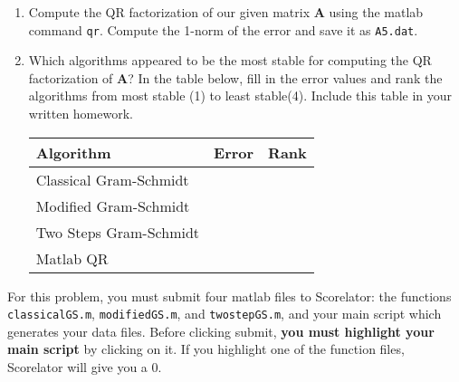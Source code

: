 \documentclass{article}
\begin{document}
\begin{enumerate}
\begin{enumerate}
	\item Compute the QR factorization of our given matrix $\mathbf{A}$ using the matlab command {\tt qr}. Compute the 1-norm of the error and save it as {\tt A5.dat}. 
	\item Which algorithms appeared to be the most stable for computing the QR factorization of $\mathbf{A}$? In the table below, fill in the error values and rank the algorithms from most stable (1) to least stable(4). Include this table in your written homework. 
	
	\begin{center}
	\begin{tabular}{| l | l | l |}
	\hline
	Algorithm & Error & Rank \\
	\hline
	Classical Gram-Schmidt & & \\
	Modified Gram-Schmidt & & \\
	Two Steps Gram-Schmidt & & \\
	Matlab QR & & \\
	\hline
	\end{tabular}
	\end{center}
	
	\end{enumerate}
	
	\bigskip
	For this problem, you must submit four matlab files to Scorelator: the functions {\tt classicalGS.m}, {\tt modifiedGS.m}, and {\tt twostepGS.m}, and your main script which generates your data files. Before clicking submit, {\bf you must highlight your main script} by clicking on it. If you highlight one of the function files, Scorelator will give you a 0. 
\end{enumerate}
\end{document}
